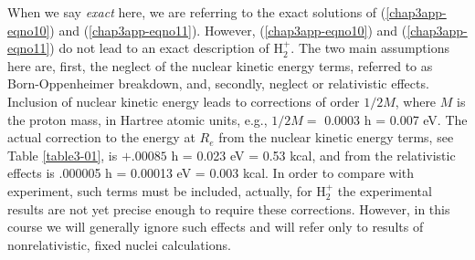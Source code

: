 When we say \emph{exact} here, we are referring to the exact solutions
of (\ref{chap3app-eqno10}) and (\ref{chap3app-eqno11}).  However,
(\ref{chap3app-eqno10}) and (\ref{chap3app-eqno11}) do not lead to an
exact description of H$^+_2$.  The two main assumptions here are,
first, the neglect of the nuclear kinetic energy terms, referred to as
Born-Oppenheimer breakdown, and, secondly, neglect or relativistic
effects.  Inclusion of nuclear kinetic energy leads to corrections of
order $1/2M$, where $M$ is the proton mass, in Hartree atomic units,
e.g., $1/2M =$ 0.0003 h = 0.007 eV.  The actual correction to the energy
at $R_e$ from the nuclear kinetic energy terms, see Table
\ref{table3-01}, is $+ .00085$ h = 0.023 eV = 0.53 kcal, and from the
relativistic effects is .000005 h = 0.00013 eV = 0.003 kcal.  In order
to compare with experiment, such terms must be included, actually, for
H$^+_2$ the experimental results are not yet precise enough to require
these corrections.  However, in this course we will generally ignore
such effects and will refer only to results of nonrelativistic, fixed
nuclei calculations.

